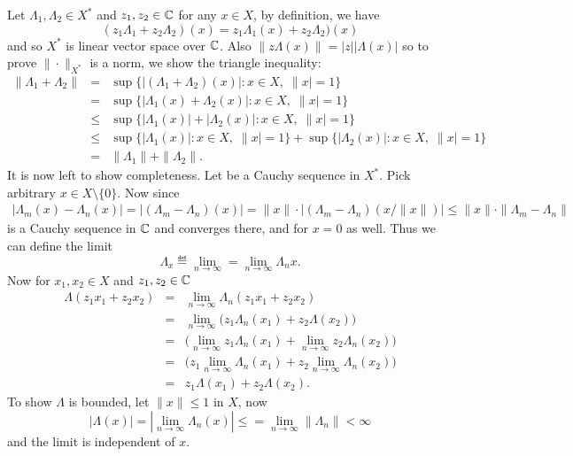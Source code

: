 \begin{enumerate}
\begin{itemize}
 Let \(\Lambda_1,\Lambda_2 \in X^*\) and \(z_1,z_2 \in \mathbb{C}\)
 for any \(x\in X\), by definition, we have
 \[ (z_1\Lambda_1 + z_2\Lambda_2)(x) = z_1\Lambda_1(x) + z_2\Lambda_2)(x)  \]
 and so \(X^*\) is linear vector space over \(\mathbb{C}\).
 Also \(\|z\Lambda(x)\| = |z||\Lambda(x)|\) so to prove \(\|\cdot\|_{X^*}\)
 is a norm, we show the triangle inequality:
 \begin{eqnarray*}
 \|\Lambda_1 + \Lambda_2\| 
 &=& \sup\{|(\Lambda_1 + \Lambda_2)(x)|: x\in X,\;\|x|=1\} \\
 &=& \sup\{|\Lambda_1(x) + \Lambda_2(x)|: x\in X,\;\|x|=1\} \\
 &\leq& \sup\{|\Lambda_1(x)| + |\Lambda_2(x)|: x\in X,\;\|x|=1\} \\
 &\leq&    \sup\{|\Lambda_1(x)|: x\in X,\;\|x|=1\}
         + \sup\{|\Lambda_2(x)|: x\in X,\;\|x|=1\} \\
 &=& \|\Lambda_1\| + \|\Lambda_2\|.
 \end{eqnarray*}
 It is now left to show completeness. 
 Let  be a Cauchy sequence in \(X^*\).
 Pick arbitrary \(x\in X\setminus\{0\}\). Now since
 \begin{eqnarray*}
 |\Lambda_m(x) - \Lambda_n(x)|
 = |(\Lambda_m - \Lambda_n)(x)|
 = \|x\|\cdot |(\Lambda_m - \Lambda_n)(x/\|x\|)|
 \leq \|x\|\cdot\|\Lambda_m - \Lambda_n\|
 \end{eqnarray*}
  is a Cauchy sequence in \(\mathbb{C}\) and converges there,
 and for \(x=0\) as well.
 Thus we can define the limit 
 \[ \Lambda_x \eqdef \lim_{n\to\infty} = \lim_{n\to\infty} \Lambda_n x.\]
 Now for \(x_1,x_2\in X\) and \(z_1,z_2\in \mathbb{C}\)
 \begin{eqnarray*}
 \Lambda (z_1 x_1 + z_2 x_2)
 &=& \lim_{n\to\infty} \Lambda_n (z_1 x_1 + z_2 x_2) \\
 &=& \lim_{n\to\infty} \bigl(z_1\Lambda_n(x_1) + z_2 \Lambda(x_2)\bigr) \\
 &=& \bigl(
             \lim_{n\to\infty} z_1\Lambda_n(x_1)
           + \lim_{n\to\infty} z_2\Lambda_n(x_2) \bigr) \\
 &=& \bigl(  z_1\lim_{n\to\infty} \Lambda_n(x_1)
           + z_2\lim_{n\to\infty} \Lambda_n(x_2) \bigr) \\
 &=& z_1\Lambda(x_1) + z_2\Lambda(x_2).
 \end{eqnarray*}
 To show \(\Lambda\) is bounded, let \(\|x\| \leq 1\) in $X$, now
 \[ |\Lambda(x)| = |\lim_{n\to\infty} \Lambda_n(x)| 
    \leq = \lim_{n\to\infty} \|\Lambda_n\| < \infty\]
 and the limit is independent of $x$.


\end{itemize}
\end{enumerate}
